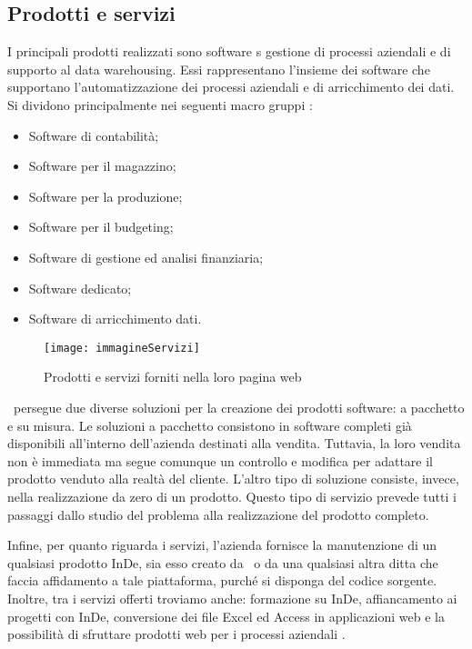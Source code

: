 \subsection{Prodotti e servizi}
\label{cap1:Prodotti e servizi}
I principali prodotti realizzati sono software s gestione di processi aziendali e di supporto al data warehousing. Essi rappresentano l'insieme dei software che supportano l'automatizzazione dei processi aziendali e di arricchimento dei dati. Si dividono principalmente nei seguenti macro gruppi \hyperref[bib2]{\cite{[2]}}:
\begin{itemize}
	\item Software di contabilità;
	\item Software per il magazzino;
	\item Software per la produzione;
	\item Software per il budgeting;
	\item Software di gestione ed analisi finanziaria;
	\item Software dedicato;
	\item Software di arricchimento dati.
\end{itemize}

\begin{figure}[!h] 
	\centering 
	\texttt{[image: immagineServizi]} 
	\caption{Prodotti e servizi forniti nella loro pagina web}
\end{figure}

\azienda\ persegue due diverse soluzioni per la creazione dei prodotti software: a pacchetto e su misura. Le soluzioni a pacchetto consistono in software completi già disponibili all'interno dell'azienda destinati alla vendita. Tuttavia, la loro vendita non è immediata ma segue comunque un controllo e modifica per adattare il prodotto venduto alla realtà del cliente. L'altro tipo di soluzione consiste, invece, nella realizzazione da zero di un prodotto. Questo tipo di servizio prevede tutti i passaggi dallo studio del problema alla realizzazione del prodotto completo.

Infine, per quanto riguarda i servizi, l'azienda fornisce la manutenzione di un qualsiasi prodotto InDe, sia esso creato da \azienda\ o da una qualsiasi altra ditta che faccia affidamento a tale piattaforma, purché si disponga del codice sorgente. Inoltre, tra i servizi offerti troviamo anche: formazione su InDe, affiancamento ai progetti con InDe, conversione dei file Excel ed Access in applicazioni web e la possibilità di sfruttare prodotti web per i processi aziendali \hyperref[bib1]{\cite{[1]}}.


